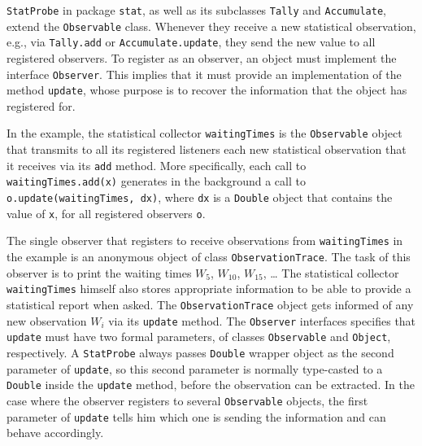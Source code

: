 \texttt{StatProbe} in package \texttt{stat}, as well as its subclasses
\texttt{Tally} and \texttt{Accumulate}, extend the \texttt{Observable} class.  
Whenever they receive a new statistical observation, e.g.,  via
\texttt{Tally.add} or \texttt{Accumulate.update}, they send the new value
to all registered observers.
To register as an observer, an object must implement the interface
\texttt{Observer}. 
This implies that it must provide an implementation of the method
\texttt{update}, whose purpose is to recover the information
that the object has registered for.

In the example, the statistical collector \texttt{waitingTimes} 
is the \texttt{Observable} object that transmits to all its registered 
listeners each new statistical observation that it receives via
its \texttt{add} method.
More specifically, each call to \texttt{waitingTimes.add(x)} generates 
in the background a call to \texttt{o.update(waitingTimes, dx)},
where \texttt{dx} is a \texttt{Double} object that contains the value of \texttt{x},
for all registered observers \texttt{o}.

\begin{comment}
The method \texttt{notifyObs} is used to
turn the tally into such an agency.  In fact, the collector is both a
tally and a distribution agency, but its tally functionality can be
disabled using the \texttt{stopCollectStat} method.  This can be useful when
the registered observers already perform statistical collection.
\end{comment}

The single observer that registers to receive observations from 
\texttt{waitingTimes} in the example is an anonymous object of class 
\texttt{ObservationTrace}.  The task of this observer is to
print the waiting times $W_5$, $W_{10}$, $W_{15}$, \dots
The statistical collector \texttt{waitingTimes} himself also stores
appropriate information to be able to provide a statistical report
when asked.
The \texttt{ObservationTrace} object gets informed of any new observation 
$W_i$ via its \texttt{update} method.
The \texttt{Observer} interfaces specifies that \texttt{update} must have two
formal parameters, of classes \texttt{Observable} and \texttt{Object}, respectively. 
A \texttt{StatProbe} always passes \texttt{Double} wrapper object as the 
second parameter of \texttt{update}, so this second parameter is normally
type-casted to a \texttt{Double} inside the \texttt{update} method,
before the observation can be extracted.
In the case where the observer registers to several \texttt{Observable}
objects, the first parameter of \texttt{update} tells him which one
is sending the information and can behave accordingly.

